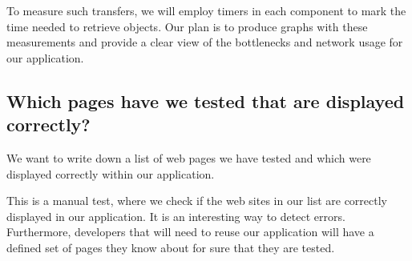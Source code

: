 \documentclass[12pt,a4paper]{article}
\begin{document}
To measure such transfers, we will employ timers in each component to mark the time needed to retrieve objects. Our plan is to produce graphs with these measurements and provide a clear view of the bottlenecks and network usage for our application.

\subsection{Which pages have we tested that are displayed correctly?}
We want to write down a list of web pages we have tested and which were displayed correctly within our application.

This is a manual test, where we check if the web sites in our list are correctly displayed in our application. It is an interesting way to detect errors. Furthermore, developers that will need to reuse our application will have a defined set of pages they know about for sure that they are tested.
\end{document}
